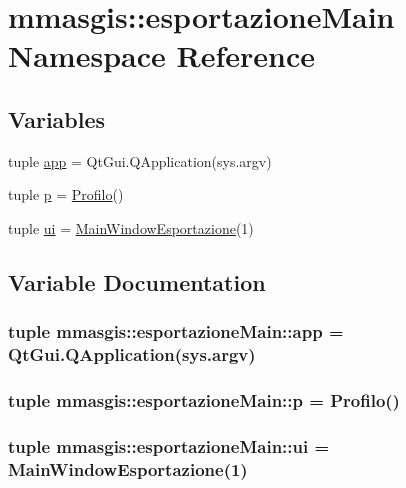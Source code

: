 \hypertarget{namespacemmasgis_1_1esportazioneMain}{
\section{mmasgis::esportazioneMain Namespace Reference}
\label{namespacemmasgis_1_1esportazioneMain}
}
\subsection*{Variables}
\begin{DoxyCompactItemize}
\item 
tuple \hyperlink{namespacemmasgis_1_1esportazioneMain_adbd10d719221da85c20b8a0872535482}{app} = QtGui.QApplication(sys.argv)
\item 
tuple \hyperlink{namespacemmasgis_1_1esportazioneMain_aaad81eb20c2b43f37b07e0e9b0df6682}{p} = \hyperlink{classmmasgis_1_1Profilo_1_1Profilo}{Profilo}()
\item 
tuple \hyperlink{namespacemmasgis_1_1esportazioneMain_a7a4abe3edd98207d5e8489af18030d7f}{ui} = \hyperlink{classmmasgis_1_1esportazione_1_1MainWindowEsportazione}{MainWindowEsportazione}(1)
\end{DoxyCompactItemize}


\subsection{Variable Documentation}
\hypertarget{namespacemmasgis_1_1esportazioneMain_adbd10d719221da85c20b8a0872535482}{
\subsubsection[{app}]{\setlength{\rightskip}{0pt plus 5cm}tuple {\bf mmasgis::esportazioneMain::app} = QtGui.QApplication(sys.argv)}}
\label{namespacemmasgis_1_1esportazioneMain_adbd10d719221da85c20b8a0872535482}
\hypertarget{namespacemmasgis_1_1esportazioneMain_aaad81eb20c2b43f37b07e0e9b0df6682}{
\subsubsection[{p}]{\setlength{\rightskip}{0pt plus 5cm}tuple {\bf mmasgis::esportazioneMain::p} = {\bf Profilo}()}}
\label{namespacemmasgis_1_1esportazioneMain_aaad81eb20c2b43f37b07e0e9b0df6682}
\hypertarget{namespacemmasgis_1_1esportazioneMain_a7a4abe3edd98207d5e8489af18030d7f}{
\subsubsection[{ui}]{\setlength{\rightskip}{0pt plus 5cm}tuple {\bf mmasgis::esportazioneMain::ui} = {\bf MainWindowEsportazione}(1)}}
\label{namespacemmasgis_1_1esportazioneMain_a7a4abe3edd98207d5e8489af18030d7f}
